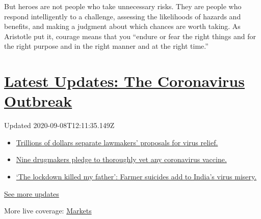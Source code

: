 But heroes are not people who take unnecessary risks. They are people
who respond intelligently to a challenge, assessing the likelihoods of
hazards and benefits, and making a judgment about which chances are
worth taking. As Aristotle put it, courage means that you ``endure or
fear the right things and for the right purpose and in the right manner
and at the right time.''

\hypertarget{latest-updates-the-coronavirus-outbreak}{%
\section{\texorpdfstring{\href{https://www.nytimes3xbfgragh.onion/2020/09/08/world/covid-19-coronavirus.html?action=click\&pgtype=Article\&state=default\&region=MAIN_CONTENT_1\&context=storylines_live_updates}{Latest
Updates: The Coronavirus
Outbreak}}{Latest Updates: The Coronavirus Outbreak}}\label{latest-updates-the-coronavirus-outbreak}}

Updated 2020-09-08T12:11:35.149Z

\begin{itemize}
\tightlist
\item
  \href{https://www.nytimes3xbfgragh.onion/2020/09/08/world/covid-19-coronavirus.html?action=click\&pgtype=Article\&state=default\&region=MAIN_CONTENT_1\&context=storylines_live_updates\#link-46162376}{Trillions
  of dollars separate lawmakers' proposals for virus relief.}
\item
  \href{https://www.nytimes3xbfgragh.onion/2020/09/08/world/covid-19-coronavirus.html?action=click\&pgtype=Article\&state=default\&region=MAIN_CONTENT_1\&context=storylines_live_updates\#link-679303d7}{Nine
  drugmakers pledge to thoroughly vet any coronavirus vaccine.}
\item
  \href{https://www.nytimes3xbfgragh.onion/2020/09/08/world/covid-19-coronavirus.html?action=click\&pgtype=Article\&state=default\&region=MAIN_CONTENT_1\&context=storylines_live_updates\#link-1c973131}{`The
  lockdown killed my father': Farmer suicides add to India's virus
  misery.}
\end{itemize}

\href{https://www.nytimes3xbfgragh.onion/2020/09/08/world/covid-19-coronavirus.html?action=click\&pgtype=Article\&state=default\&region=MAIN_CONTENT_1\&context=storylines_live_updates}{See
more updates}

More live coverage:
\href{https://www.nytimes3xbfgragh.onion/live/2020/09/08/business/stock-market-today-coronavirus?action=click\&pgtype=Article\&state=default\&region=MAIN_CONTENT_1\&context=storylines_live_updates}{Markets}

